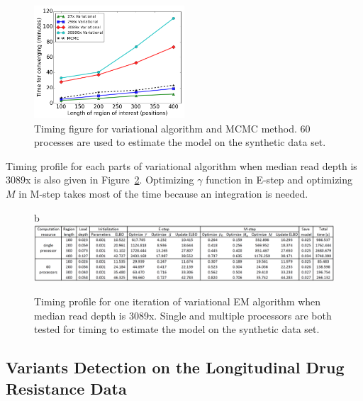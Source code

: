 \documentclass{article}
\begin{document}
\begin{figure}[htbp]
\centering
\includegraphics[width=0.5\textwidth]{tables/timing_var_mcmc.png}
\caption{Timing figure for variational algorithm and MCMC method.
60 processes are used to estimate the model on the synthetic data set.}
\vspace{-10pt}
\label{tbl:timing_mcmc_var}
\end{figure}

Timing profile for each parts of variational algorithm when median read depth is 3089x is also given in Figure~\ref{tbl:timing_profile_all}.
Optimizing $\gamma$ function in E-step and optimizing $M$ in M-step takes most of the time because an integration is needed.

\begin{figure}{b}
\centering
\includegraphics[width=1.0\textwidth]{tables/time_3089X_all.png}
\caption{Timing profile for one iteration of variational EM algorithm when median read depth is 3089x.
Single and multiple processors are both tested for timing to estimate the model on the synthetic data set.}
\label{tbl:timing_profile_all}
\end{figure}

\subsection{Variants Detection on the Longitudinal Drug Resistance Data}
\end{document}
